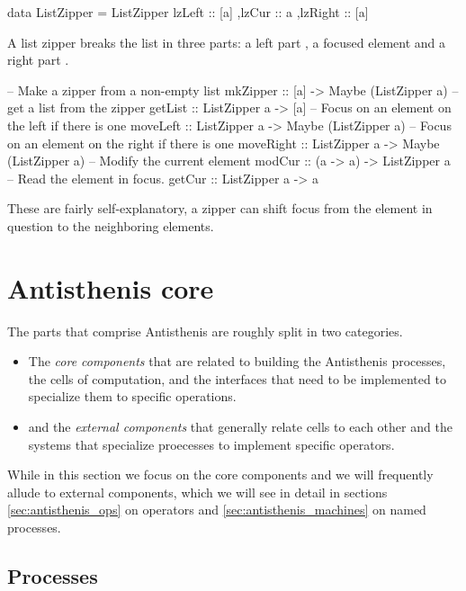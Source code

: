 \begin{haskellcode}
data ListZipper =
  ListZipper
  { lzLeft :: [a]
   ,lzCur :: a
   ,lzRight :: [a]
  }
\end{haskellcode}

A list zipper breaks the list in three parts: a left part , a
focused element  and a right part .

\begin{haskellcode}
-- Make a zipper from a non-empty list
mkZipper :: [a] -> Maybe (ListZipper a)
-- get a list from the zipper
getList :: ListZipper a -> [a]
-- Focus on an element on the left if there is one
moveLeft :: ListZipper a -> Maybe (ListZipper a)
-- Focus on an element on the right if there is one
moveRight :: ListZipper a -> Maybe (ListZipper a)
-- Modify the current element
modCur :: (a -> a) -> ListZipper a
-- Read the element in focus.
getCur :: ListZipper a -> a
\end{haskellcode}

These are fairly self-explanatory, a zipper can shift focus from the
element in question to the neighboring elements.

\section{Antisthenis core}

The parts that comprise Antisthenis are roughly split in two
categories.

\begin{itemize}
\item The \emph{core components} that are related to building the
  Antisthenis processes, the cells of computation, and the interfaces
  that need to be implemented to specialize them to specific
  operations.
\item and the \emph{external components} that generally relate cells
  to each other and the systems that specialize proecesses to
  implement specific operators.
\end{itemize}

While in this section we focus on the core components and we will
frequently allude to external components, which we will see in detail
in sections \ref{sec:antisthenis_ops} on operators and
\ref{sec:antisthenis_machines} on named processes.

\subsection{Processes}
\label{sec:antisthenis_processes}

